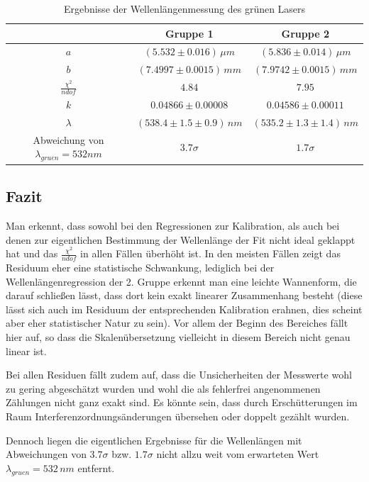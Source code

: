 \documentclass[a4paper, 11pt]{article}
\begin{document}
\begin{table}[H]
	\renewcommand{\arraystretch}{1.5}
	\centering
	\begin{tabular}{|c|c|c|}
		\hline  	&	Gruppe 1	&	Gruppe 2  	\\
		\hline	$a$ &	$ (5.532 \pm 0.016) \,\mu m$		&	$ (5.836 \pm 0.014)\, \mu m $ \\
		\hline  $b$	&	$ (7.4997 \pm 0.0015)\, mm$		&	$ (7.9742 \pm 0.0015)\, mm$ \\
		\hline $\frac{\chi^2}{ndof}$	&	$4.84$	&	$7.95$	\\
		\hline  $k$	&	$ 0.04866 \pm 0.00008 $		&	$ 0.04586 \pm 0.00011$ \\
		\hline $\lambda$	&	$ (538.4 \pm 1.5 \pm 0.9)\, nm$ &	$ (535.2 \pm 1.3 \pm 1.4)\, nm $ \\
		\hline Abweichung von $\lambda_{gruen} = 532 nm$	&	$ 3.7 \sigma $		&	$ 1.7 \sigma $	\\
		\hline
	\end{tabular}
	\caption{Ergebnisse der Wellenlängenmessung des grünen Lasers}
	\label{table:lambda_final}
\end{table}

\subsection{Fazit}
Man erkennt, dass sowohl bei den Regressionen zur Kalibration, als auch bei denen zur eigentlichen Bestimmung der Wellenlänge der Fit nicht ideal geklappt hat und das $\frac{\chi^2}{ndof}$ in allen Fällen überhöht ist. In den meisten Fällen zeigt das Residuum eher eine statistische Schwankung, lediglich bei der Wellenlängenregression der 2. Gruppe erkennt man eine leichte Wannenform, die darauf schließen lässt, dass dort kein exakt linearer Zusammenhang besteht (diese lässt sich auch im Residuum der entsprechenden Kalibration erahnen, dies scheint aber eher statistischer Natur zu sein). Vor allem der Beginn des Bereiches fällt hier auf, so dass die Skalenübersetzung vielleicht in diesem Bereich nicht genau linear ist.

Bei allen Residuen fällt zudem auf, dass die Unsicherheiten der Messwerte wohl zu gering abgeschätzt wurden und wohl die als fehlerfrei angenommenen Zählungen nicht ganz exakt sind. Es könnte sein, dass durch Erschütterungen im Raum Interferenzordnungsänderungen übersehen oder doppelt gezählt wurden.

Dennoch liegen die eigentlichen Ergebnisse für die Wellenlängen mit Abweichungen von $3.7 \sigma$ bzw. $1.7 \sigma$ nicht allzu weit vom erwarteten Wert $\lambda_{gruen} = 532 \, nm$ entfernt.
\end{document}
